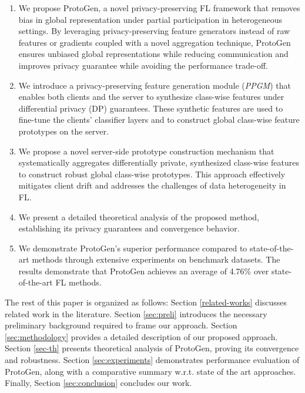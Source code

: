 \documentclass[lettersize,journal]{IEEEtran}
\begin{document}
\begin{enumerate}
	\item We propose \textsf{ProtoGen}, a novel privacy-preserving FL framework that removes bias in global representation under partial participation in heterogeneous settings. By leveraging privacy-preserving feature generators instead of raw features or gradients coupled with a novel aggregation technique, \textsf{ProtoGen} ensures unbiased global representations while reducing communication and improves privacy guarantee while avoiding the performance trade-off.
	\item We introduce a privacy-preserving feature generation module (\emph{PPGM}) that enables both clients and the server to synthesize class-wise features under differential privacy (DP) guarantees. These synthetic features are used to fine-tune the clients’ classifier layers and to construct global class-wise feature prototypes on the server.
	\item We propose a novel server-side prototype construction mechanism that systematically aggregates differentially private, synthesized class-wise features to construct robust global class-wise prototypes. This approach effectively mitigates client drift and addresses the challenges of data heterogeneity in FL.
	\item We present a detailed theoretical analysis of the proposed method, establishing its privacy guarantees and convergence behavior.
	\item We demonstrate \textsf{ProtoGen}'s superior performance compared to state-of-the-art methods through extensive experiments on benchmark datasets. The results demonstrate that \textsf{ProtoGen} achieves an average of 4.76\% over state-of-the-art FL methods.
\end{enumerate} 

The rest of this paper is organized as follows: Section \ref{related-works} discusses related work in the literature. Section \ref{sec:preli} introduces the necessary preliminary background required to frame our approach. Section \ref{sec:methodology} provides a detailed description of our proposed approach. Section \ref{sec-th} presents theoretical analysis of \textsf{ProtoGen}, proving its convergence and robustness. Section \ref{sec:experiments} demonstrates performance evaluation of \textsf{ProtoGen}, along with a comparative summary w.r.t. state of the art approaches. Finally, Section \ref{sec:conclusion} concludes our work.
\end{document}
